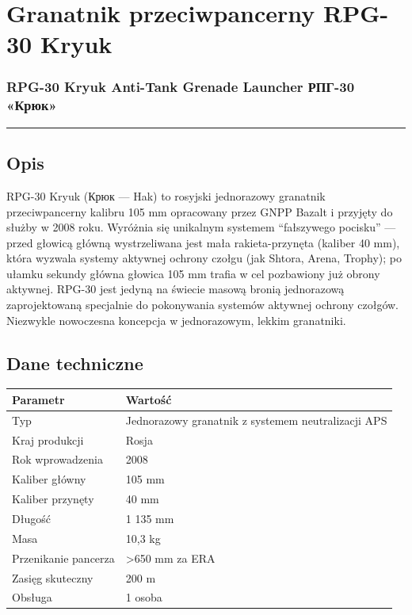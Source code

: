 \documentclass[12pt,openany,oneside]{book}
\begin{document}
\chapter{Granatnik przeciwpancerny RPG-30
Kryuk}\label{granatnik-przeciwpancerny-rpg-30-kryuk}

\subsection{RPG-30 Kryuk Anti-Tank Grenade Launcher \textbar{} РПГ-30
«Крюк»}\label{rpg-30-kryuk-anti-tank-grenade-launcher-ux440ux43fux433-30-ux43aux440ux44eux43a}

\begin{center}\rule{0.5\linewidth}{0.5pt}\end{center}

\section{Opis}\label{opis-74}

RPG-30 Kryuk (Крюк --- Hak) to rosyjski jednorazowy granatnik
przeciwpancerny kalibru 105 mm opracowany przez GNPP Bazalt i przyjęty
do służby w 2008 roku. Wyróżnia się unikalnym systemem ``fałszywego
pocisku'' --- przed głowicą główną wystrzeliwana jest mała
rakieta-przynęta (kaliber 40 mm), która wyzwala systemy aktywnej ochrony
czołgu (jak Shtora, Arena, Trophy); po ułamku sekundy główna głowica 105
mm trafia w cel pozbawiony już obrony aktywnej. RPG-30 jest jedyną na
świecie masową bronią jednorazową zaprojektowaną specjalnie do
pokonywania systemów aktywnej ochrony czołgów. Niezwykle nowoczesna
koncepcja w jednorazowym, lekkim granatniki.

\section{Dane techniczne}\label{dane-techniczne-74}

\begin{longtable}[]{@{}ll@{}}
\toprule\noalign{}
Parametr & Wartość \\
\midrule\noalign{}
\endhead
\bottomrule\noalign{}
\endlastfoot
Typ & Jednorazowy granatnik z systemem neutralizacji APS \\
Kraj produkcji & Rosja \\
Rok wprowadzenia & 2008 \\
Kaliber główny & 105 mm \\
Kaliber przynęty & 40 mm \\
Długość & 1 135 mm \\
Masa & 10,3 kg \\
Przenikanie pancerza & \textgreater650 mm za ERA \\
Zasięg skuteczny & 200 m \\
Obsługa & 1 osoba \\
\end{longtable}
\end{document}

